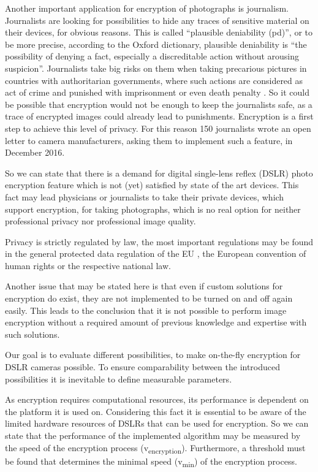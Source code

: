 \documentclass[12pt,a4paper,titlepage,oneside]{scrartcl}
\begin{document}
Another important application for encryption of photographs is journalism.
Journalists are looking for possibilities to hide any traces of sensitive material on their devices, for obvious reasons.
This is called ``plausible deniability (pd)'', or to be more precise, according to the Oxford dictionary, plausible deniability is ``the possibility of denying a fact, especially a discreditable action without arousing suspicion''.\cite{OxforddictPlausibleDen}
Journalists take big risks on them when taking precarious pictures in countries with authoritarian governments, where such actions are considered as act of crime and punished with imprisonment or even death penalty \cite{Amnesty2016}.
So it could be possible that encryption would not be enough to keep the journalists safe, as a trace of encrypted images could already lead to punishments.
Encryption is a first step to achieve this level of privacy.
For this reason 150 journalists wrote an open letter to camera manufacturers, asking them to implement such a feature, in December 2016.\cite{fp2016}

So we can state that there is a demand for digital single-lens reflex (DSLR) photo encryption feature which is not (yet) satisfied by state of the art devices.
This fact may lead physicians or journalists to take their private devices, which support encryption, for taking photographs, which is no real option for neither professional privacy nor professional image quality.

Privacy is strictly regulated by law, the most important regulations may be found in the general protected data regulation of the EU \cite{EuropeanParliament2016}, the European convention of human rights \cite{EuropeanCourtofHumanRights2010} or the respective national law. \cite{EHG2015, DSG2000, ELGA2012}

Another issue that may  be stated here is that even if custom solutions for encryption do exist, they are not implemented to be turned on and off again easily.
This leads to the conclusion that it is not possible to perform image encryption without a required amount of previous knowledge and expertise with such solutions.

Our goal is to evaluate different possibilities, to make on-the-fly encryption for DSLR cameras possible.
To ensure comparability between the introduced possibilities it is inevitable to define measurable parameters.

As encryption requires computational resources, its performance is dependent on the platform it is used on.
Considering this fact it is essential to be aware of the limited hardware resources of DSLRs that can be used for encryption.
So we can state that the performance of the implemented algorithm may be measured by the speed of the encryption process (v\textsubscript{encryption}).
Furthermore, a threshold must be found that determines the minimal speed (v\textsubscript{min}) of the encryption process.
\end{document}
